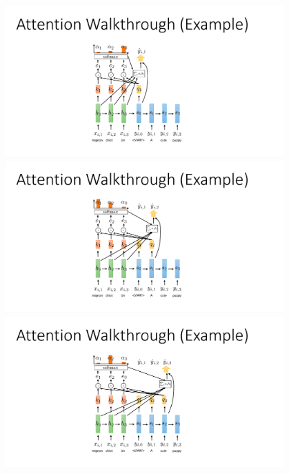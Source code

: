 \documentclass{book}
\begin{document}
\begin{figure}[H]
    \centering
    \includegraphics[width=0.95\textwidth]{images/lec11_18.png}
    \includegraphics[width=0.95\textwidth]{images/lec11_19.png}
    \includegraphics[width=0.95\textwidth]{images/lec11_20.png}
\end{figure}
\end{document}
